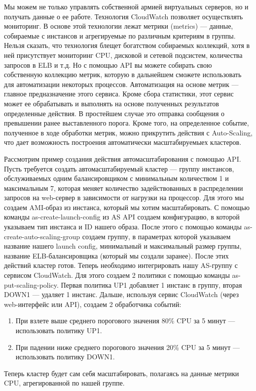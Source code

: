 \documentclass[10pt, a5paper]{article}
\begin{document}
Мы можем не только управлять собственной армией виртуальных серверов, но и получать данные о ее работе. Технология CloudWatch позволяет осуществлять мониторинг. В основе этой технологии лежат метрики (metrics) --- данные, собираемые с инстансов и агрегируемые по различным критериям в группы. Нельзя сказать, что технология блещет богатством собираемых коллекций, хотя в ней присутствует мониторинг CPU, дисковой и сетевой подсистем, количества запросов в ELB и т.д. Но с помощью API вы можете собирать свою собственную коллекцию метрик, которую в дальнейшем сможете использовать для автоматизации некоторых процессов. Автоматизация на основе метрик --- главное предназначение этого сервиса. Кроме сбора статистики, этот сервис может ее обрабатывать и выполнять на основе полученных результатов определенные действия. В простейшем случае это отправка сообщения о превышении ранее выставленного порога. Кроме того, на определенное событие, полученное в ходе обработки метрик, можно прикрутить действия с Auto-Scaling, что дает возможность построения автоматически масштабируемыех кластеров. 

Рассмотрим пример создания действия автомасштабирования с помощью API. Пусть требуется создать автомасштабируемый кластер --- группу инстансов, обслуживаемых одним балансировщиком с минимальным количеством 1 и максимальным 7, которая меняет количество задействованных в распределении запросов на web-сервер в зависимости от нагрузки на процессор. Для этого мы создаем AMI-образ из инстанса, который мы хотим масштабировать. С помощью команды as-create-launch-config из AS API создаем конфигурацию, в которой указываем тип инстанса и ID нашего образа. После этого с помощью команды as-create-auto-scaling-group создаем группу, в параметрах которой указываем название нашего launch config, минимальный и максимальный размер группы, название ELB-балансировщика (который мы создали заранее). После этих действий кластер готов. Теперь необходимо интегрировать нашу AS-группу с сервисом CloudWatch. Для этого создаем 2 политики с помощью команды as-put-scaling-policy. Первая политика UP1 добавляет 1 инстанс в группу, вторая DOWN1 --- удаляет 1 инстанс. Дальше, используя сервис CloudWatch (через web-интерфейс или API), создаем 2 обработчика событий: 
\begin{enumerate}
	\item При взлете выше среднего порогового значения 80\% CPU за 5 минут --- использовать политику UP1. 
	\item При падении ниже среднего порогового значения 20\% CPU за 5 минут --- использовать политику DOWN1. 
\end{enumerate}
Теперь кластер будет сам себя масштабировать, полагаясь на данные метрики CPU, агрегированной по нашей группе. 
\end{document}
